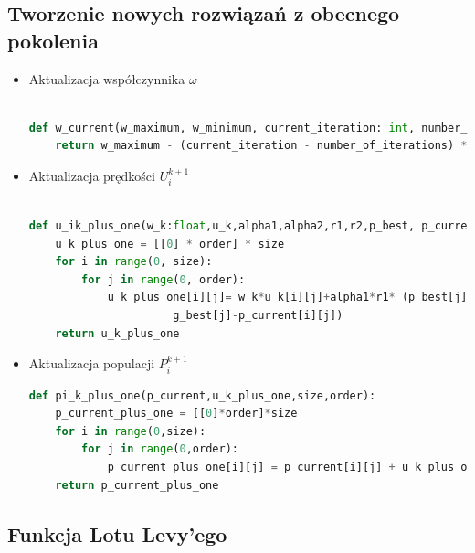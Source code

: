 \documentclass[eng, pl, oneside, openright, final, openbib]{mgr}\DeclareUnicodeCharacter{0301}{\'{e}}
\begin{document}
\subsection{Tworzenie nowych rozwiązań z obecnego pokolenia}
\begin{itemize}
\item Aktualizacja współczynnika $\omega$
\begin{lstlisting}[language=Python, caption=Implementacja aktualizacji współczynnika $\omega$]

def w_current(w_maximum, w_minimum, current_iteration: int, number_of_iterations: int):
    return w_maximum - (current_iteration - number_of_iterations) * (w_maximum - w_minimum)
\end{lstlisting}
\item Aktualizacja prędkości $U^{k + 1}_{i}$
\begin{lstlisting}[language=Python, caption=Implementacja aktualizacji współczynnika prędkości $U^{k + 1}_{i}$]

def u_ik_plus_one(w_k:float,u_k,alpha1,alpha2,r1,r2,p_best, p_current, g_best,size:int,order:int):
    u_k_plus_one = [[0] * order] * size
    for i in range(0, size):
        for j in range(0, order):
            u_k_plus_one[i][j]= w_k*u_k[i][j]+alpha1*r1* (p_best[j]-p_current[i][j])+alpha2*r2*(
                      g_best[j]-p_current[i][j])
    return u_k_plus_one
\end{lstlisting}
\item Aktualizacja populacji $P^{k + 1}_{i}$
\begin{lstlisting}[language=Python, caption=Implementacja aktualizacji współczynnika prędkości $P^{k + 1}_{i}$]
def pi_k_plus_one(p_current,u_k_plus_one,size,order):
    p_current_plus_one = [[0]*order]*size
    for i in range(0,size):
        for j in range(0,order):
            p_current_plus_one[i][j] = p_current[i][j] + u_k_plus_one[i][j]
    return p_current_plus_one
\end{lstlisting}

\end{itemize}
\newpage
\subsection{Funkcja Lotu Levy'ego}
\end{document}

